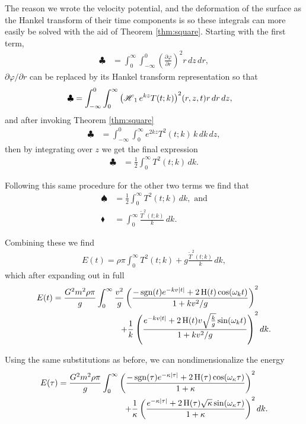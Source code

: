 The reason we wrote the velocity potential, and the deformation of the surface as the Hankel transform of their time components is so these integrals can more easily be solved with the aid of Theorem \ref{thm:square}. Starting with the first term,
\begin{align*}
\clubsuit &= \int_0^\infty \int_{-\infty}^0 \left( \frac{\partial \varphi}{\partial r} \right)^2 r \, dz \, dr,
\end{align*}
$\partial \varphi / \partial r$ can be replaced by its Hankel transform representation so that
\begin{align*}
\clubsuit &= \int_{-\infty}^0 \int_0^\infty \Hank[1]{e^{kz}T(t;k)}^2(r,z,t) r \, dr \, dz,
\end{align*}
and after invoking Theorem \ref{thm:square}
\begin{align*}
\clubsuit &= \int_{-\infty}^0 \int_0^\infty e^{2kz} T^2(t;k) \, k \, dk \, dz,
\end{align*}
then by integrating over $z$ we get the final expression
\begin{align*}
\clubsuit &= \frac{1}{2} \int_0^\infty T^2(t;k) \, dk.
\end{align*}

Following this same procedure for the other two terms we find that
\begin{align*}
\spadesuit &= \frac{1}{2} \int_0^\infty T^2(t;k) \, dk, \text{ and} \\
\blacklozenge &= \int_0^\infty \frac{\widetilde{T}^2(t;k)}{k} \, dk.
\end{align*}

Combining these we find
\begin{align*}
E(t) = \rho \pi \int_0^\infty T^2(t;k) + g \frac{\widetilde{T}^2(t;k)}{k} \, dk,
\end{align*}
which after expanding out in full
\begin{equation*}
\begin{split}
E(t) = \frac{G^2 m^2 \rho \pi}{g} \int_0^\infty \frac{v^2}{g} \left( \frac{- \sgn(t) e^{-kv |t|} + 2 \Heavi(t) \cos(\omega_k t)}{1+kv^2/g} \right)^2& \\
+ \frac{1}{k} \left( \frac{e^{-kv |t|} + 2 \Heavi(t) v \sqrt{\frac{k}{g}} \sin(\omega_k t)}{1+kv^2/g} \right)^2& \, dk.
\end{split}
\end{equation*}

Using the same substitutions as before, we can nondimensionalize the energy
\begin{equation}
\label{eq:fullenergynon}
\begin{split}
E(\tau) = \frac{G^2 m^2 \rho \pi}{g} \int_0^\infty \left( \frac{- \sgn(\tau) e^{-\kappa |\tau|} + 2 \Heavi(\tau) \cos(\omega_\kappa \tau)}{1+\kappa} \right)^2& \\
+ \frac{1}{\kappa} \left( \frac{e^{-\kappa |\tau|} + 2 \Heavi(\tau) \sqrt{\kappa} \sin(\omega_\kappa \tau)}{1+\kappa} \right)^2& \, dk.
\end{split}
\end{equation}

